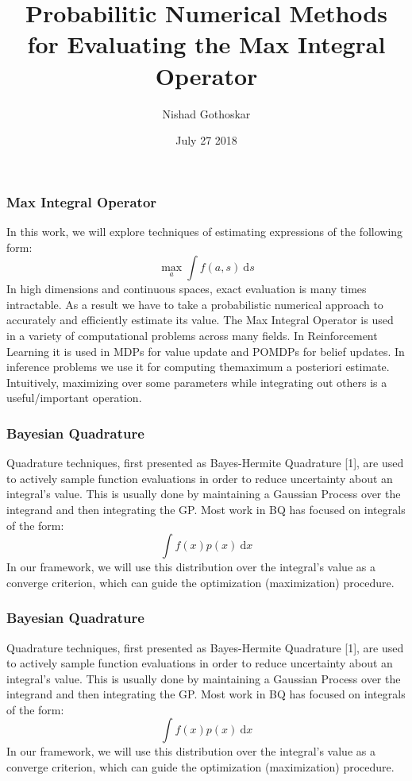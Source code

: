 \documentclass[9pt]{beamer}
\title{Probabilitic Numerical Methods for Evaluating the Max Integral Operator}
\author{Nishad Gothoskar}
\institute{Learning and Intelligent Systems}
\date{July 27 2018}
\begin{document}
 
\frame{\titlepage}
 
\begin{frame}
\frametitle{Max Integral Operator}
In this work, we will explore techniques of estimating expressions of the following form:
\begin{equation*}
    \max_{a} \int f(a,s) \ \text{d}s
\end{equation*}
In high dimensions and continuous spaces, exact evaluation is many times intractable. As a result we have to take a probabilistic numerical approach to accurately and efficiently estimate its value.
\newline \newline
The Max Integral Operator is used in a variety of computational problems across many fields. In 
Reinforcement Learning it is used in MDPs for value update and POMDPs for belief updates. In inference problems we use it for computing themaximum a posteriori estimate. Intuitively, maximizing over some parameters while integrating out others is a useful/important operation.
\end{frame}

\begin{frame}
\frametitle{Bayesian Quadrature}
Quadrature techniques, first presented as Bayes-Hermite Quadrature [1], are used to actively sample function evaluations in order to reduce uncertainty about an integral's value. This is usually done by maintaining a Gaussian Process over the integrand and then integrating the GP. 
\newline\newline
Most work in BQ has focused on integrals of the form:
\begin{equation*}
   \int f(x) p(x)  \ \text{d}x
\end{equation*}
In our framework, we will use this distribution over the integral's value as a converge criterion, which can guide the optimization (maximization) procedure.
\end{frame}

\begin{frame}
\frametitle{Bayesian Quadrature}
Quadrature techniques, first presented as Bayes-Hermite Quadrature [1], are used to actively sample function evaluations in order to reduce uncertainty about an integral's value. This is usually done by maintaining a Gaussian Process over the integrand and then integrating the GP. 
\newline\newline
Most work in BQ has focused on integrals of the form:
\begin{equation*}
   \int f(x) p(x)  \ \text{d}x
\end{equation*}
In our framework, we will use this distribution over the integral's value as a converge criterion, which can guide the optimization (maximization) procedure.
\end{frame}
\end{document}
